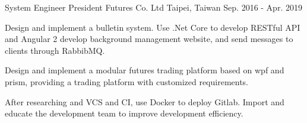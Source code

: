 \begin{cventries}
\cventry
{System Engineer} %
{President Futures Co. Ltd} %
{Taipei, Taiwan} %
{Sep. 2016 - Apr. 2019} %
{
  \begin{cvitems} %
    \item {Design and implement a bulletin system. Use .Net Core to develop RESTful API and Angular 2 develop background management website, and send messages to clients through RabbibMQ.}
    \item {Design and implement a modular futures trading platform based on wpf and prism, providing a trading platform with customized requirements.}
    \item {After researching and VCS and CI, use Docker to deploy Gitlab. Import and educate the development team to improve development efficiency.}
  \end{cvitems}
}

\end{cventries}
